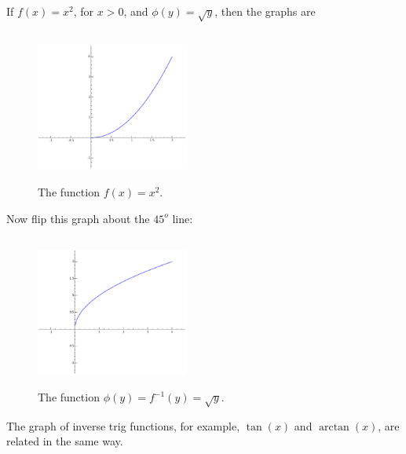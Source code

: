 \begin{example}
{\rm
If $f(x)=x^2$, for $x>0$, and $\phi(y)=\sqrt{y}$, then the graphs are


\begin{figure}[h!]
\begin{minipage}{\textwidth}
\begin{center}
\includegraphics[height=5cm,width=5cm]{fcn-x2.eps}
\end{center}
\end{minipage}
\caption{The function $f(x)=x^2$.}
\label{fig:fcn-x2}
\end{figure}


Now flip this graph about the $45^o$ line:

\newpage

\begin{figure}[h!]
\begin{minipage}{\textwidth}
\begin{center}
\includegraphics[height=5cm,width=5cm]{invfcn-x2.eps}
\end{center}
\end{minipage}
\caption{The function $\phi(y)=f^{-1}(y)=\sqrt{y}$.}
\label{fig:invx2}
\end{figure}

The graph of inverse trig functions, for example,
$\tan(x)$ and $\arctan(x)$, are related in the same way.
}
\end{example}


